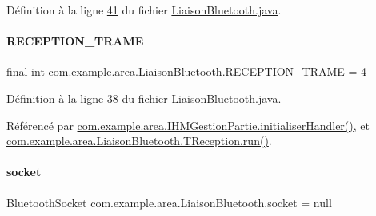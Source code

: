 Définition à la ligne \hyperlink{_liaison_bluetooth_8java_source_l00041}{41} du fichier \hyperlink{_liaison_bluetooth_8java_source}{Liaison\+Bluetooth.\+java}.

\mbox{\label{classcom_1_1example_1_1area_1_1_liaison_bluetooth_a1a3058c683cec15fe0f3699f7fc26073}} 
\paragraph{\texorpdfstring{R\+E\+C\+E\+P\+T\+I\+O\+N\+\_\+\+T\+R\+A\+ME}{RECEPTION\_TRAME}}
{\footnotesize\ttfamily final int com.\+example.\+area.\+Liaison\+Bluetooth.\+R\+E\+C\+E\+P\+T\+I\+O\+N\+\_\+\+T\+R\+A\+ME = 4\hspace{0.3cm}{\ttfamily [static]}}



Définition à la ligne \hyperlink{_liaison_bluetooth_8java_source_l00038}{38} du fichier \hyperlink{_liaison_bluetooth_8java_source}{Liaison\+Bluetooth.\+java}.



Référencé par \hyperlink{_i_h_m_gestion_partie_8java_source_l00291}{com.\+example.\+area.\+I\+H\+M\+Gestion\+Partie.\+initialiser\+Handler()}, et \hyperlink{_liaison_bluetooth_8java_source_l00240}{com.\+example.\+area.\+Liaison\+Bluetooth.\+T\+Reception.\+run()}.

\mbox{\label{classcom_1_1example_1_1area_1_1_liaison_bluetooth_ab59b57f5e59d0236e49ecf68c053cb27}} 
\paragraph{\texorpdfstring{socket}{socket}}
{\footnotesize\ttfamily Bluetooth\+Socket com.\+example.\+area.\+Liaison\+Bluetooth.\+socket = null\hspace{0.3cm}{\ttfamily [private]}}



